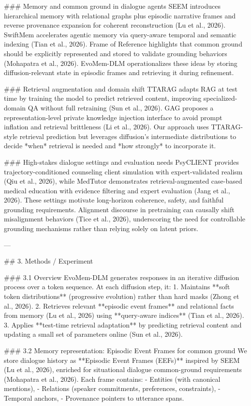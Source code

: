 ### Memory and common ground in dialogue agents  
SEEM introduces hierarchical memory with relational graphs plus episodic narrative frames and reverse provenance expansion for coherent reconstruction (Lu et al., 2026). SwiftMem accelerates agentic memory via query-aware temporal and semantic indexing (Tian et al., 2026). Frame of Reference highlights that common ground should be explicitly represented and stored to validate grounding behaviors (Mohapatra et al., 2026). EvoMem-DLM operationalizes these ideas by storing diffusion-relevant state in episodic frames and retrieving it during refinement.

### Retrieval augmentation and domain shift  
TTARAG adapts RAG at test time by training the model to predict retrieved content, improving specialized-domain QA without full retraining (Sun et al., 2026). GAG proposes a representation-level private knowledge injection interface to avoid prompt inflation and retrieval brittleness (Li et al., 2026). Our approach uses TTARAG-style retrieval prediction but leverages diffusion’s intermediate distributions to decide *when* retrieval is needed and *how strongly* to incorporate it.

### High-stakes dialogue settings and evaluation needs  
PsyCLIENT provides trajectory-conditioned counseling client simulation with expert-validated realism (Qiu et al., 2026), while MedTutor demonstrates retrieval-augmented case-based medical education with evidence filtering and expert evaluation (Jang et al., 2026). These settings motivate long-horizon coherence, safety, and faithful grounding requirements. Alignment discourse in pretraining can causally shift misalignment behaviors (Tice et al., 2026), underscoring the need for controllable grounding mechanisms rather than relying solely on latent priors.

---

## 3. Methods / Experiment  

### 3.1 Overview  
EvoMem-DLM generates responses in an iterative diffusion process over a token sequence. At each diffusion step, it:
1. Maintains **soft token distributions** (progressive evolution) rather than hard masks (Zhong et al., 2026).
2. Retrieves relevant **episodic event frames** and relational facts from memory (Lu et al., 2026) using **query-aware indices** (Tian et al., 2026).
3. Applies **test-time retrieval adaptation** by predicting retrieval content and updating a small set of parameters online (Sun et al., 2026).

### 3.2 Memory representation: Episodic Event Frames for common ground  
We store dialogue history as **Episodic Event Frames (EEFs)** inspired by SEEM (Lu et al., 2026), enriched for situational dialogue common-ground requirements (Mohapatra et al., 2026). Each frame contains:
- Entities (with canonical mentions),
- Relations (speaker commitments, preferences, constraints),
- Temporal anchors,
- Provenance pointers to utterance spans.


